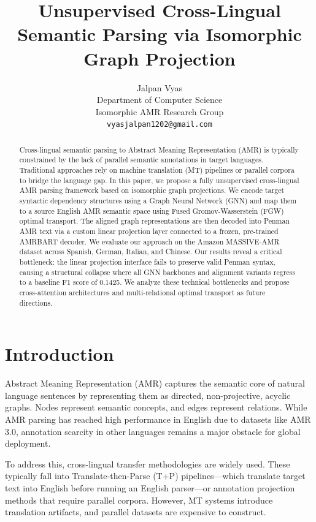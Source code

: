 \documentclass[11pt,a4paper,twocolumn]{article}
\title{\textbf{Unsupervised Cross-Lingual Semantic Parsing via Isomorphic Graph Projection}}
\author{Jalpan Vyas \\
  Department of Computer Science \\
  Isomorphic AMR Research Group \\
  \texttt{vyasjalpan1202@gmail.com} \\}
\date{}
\begin{document}
\maketitle

\begin{abstract}
Cross-lingual semantic parsing to Abstract Meaning Representation (AMR) is typically constrained by the lack of parallel semantic annotations in target languages. Traditional approaches rely on machine translation (MT) pipelines or parallel corpora to bridge the language gap. In this paper, we propose a fully unsupervised cross-lingual AMR parsing framework based on isomorphic graph projections. We encode target syntactic dependency structures using a Graph Neural Network (GNN) and map them to a source English AMR semantic space using Fused Gromov-Wasserstein (FGW) optimal transport. The aligned graph representations are then decoded into Penman AMR text via a custom linear projection layer connected to a frozen, pre-trained AMRBART decoder. We evaluate our approach on the Amazon MASSIVE-AMR dataset across Spanish, German, Italian, and Chinese. Our results reveal a critical bottleneck: the linear projection interface fails to preserve valid Penman syntax, causing a structural collapse where all GNN backbones and alignment variants regress to a baseline F1 score of 0.1425. We analyze these technical bottlenecks and propose cross-attention architectures and multi-relational optimal transport as future directions.
\end{abstract}

\section{Introduction}
Abstract Meaning Representation (AMR) \cite{banarescu-etal-2013-abstract} captures the semantic core of natural language sentences by representing them as directed, non-projective, acyclic graphs. Nodes represent semantic concepts, and edges represent relations. While AMR parsing has reached high performance in English due to datasets like AMR 3.0, annotation scarcity in other languages remains a major obstacle for global deployment.

To address this, cross-lingual transfer methodologies are widely used. These typically fall into Translate-then-Parse (T+P) pipelines—which translate target text into English before running an English parser—or annotation projection methods that require parallel corpora. However, MT systems introduce translation artifacts, and parallel datasets are expensive to construct.
\end{document}
